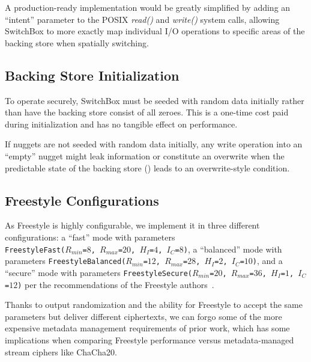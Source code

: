 A production-ready implementation would be greatly simplified by adding an
``intent'' parameter to the POSIX \textit{read()} and \textit{write()} system
calls, allowing SwitchBox to more exactly map individual I/O operations to
specific areas of the backing store when spatially switching.  

\subsection{Backing Store Initialization}

To operate securely, SwitchBox must be seeded with random data initially rather
than have the backing store consist of all zeroes. This is a one-time cost paid
during initialization and has no tangible effect on performance.

If nuggets are not seeded with random data initially, any write operation into
an ``empty'' nugget might leak information or constitute an overwrite when the
predictable state of the backing store () leads to
an overwrite-style condition.

\subsection{Freestyle Configurations}

As Freestyle is highly configurable, we implement it in three different
configurations: a ``fast'' mode with parameters
\\\texttt{FreestyleFast($R_{min}$=$8$, $R_{max}$=$20$, $H_I$=$4$, $I_C$=$8$)}, a
``balanced'' mode with parameters \texttt{FreestyleBalanced($R_{min}$=$12$,
$R_{max}$=$28$, $H_I$=$2$, $I_C$=$10$)}, and a ``secure'' mode with parameters
\texttt{FreestyleSecure($R_{min}$=$20$, $R_{max}$=$36$, $H_I$=$1$,
$I_C$=$12$)} per the recommendations of the Freestyle authors~\cite{Freestyle}.

Thanks to output randomization and the ability for Freestyle to accept the same
parameters but deliver different ciphertexts, we can forgo some of the more
expensive metadata management requirements of prior work, which has some
implications when comparing Freestyle performance versus metadata-managed stream
ciphers like ChaCha20.
